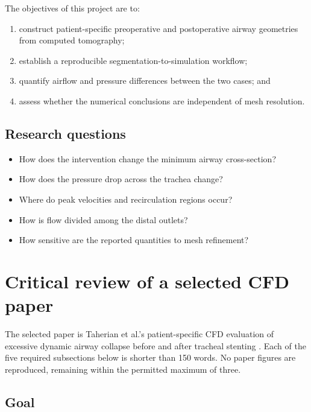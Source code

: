 \documentclass[11pt,a4paper]{article}
\begin{document}
The objectives of this project are to:

\begin{enumerate}[label=\arabic*.]
  \item construct patient-specific preoperative and postoperative airway
        geometries from computed tomography;
  \item establish a reproducible segmentation-to-simulation workflow;
  \item quantify airflow and pressure differences between the two cases; and
  \item assess whether the numerical conclusions are independent of mesh
        resolution.
\end{enumerate}

\subsection{Research questions}

\begin{itemize}
  \item How does the intervention change the minimum airway cross-section?
  \item How does the pressure drop across the trachea change?
  \item Where do peak velocities and recirculation regions occur?
  \item How is flow divided among the distal outlets?
  \item How sensitive are the reported quantities to mesh refinement?
\end{itemize}

\section{Critical review of a selected CFD paper}
\label{sec:paper_review}

The selected paper is Taherian et al.'s patient-specific CFD evaluation of
excessive dynamic airway collapse before and after tracheal stenting
\cite{taherian2017}. Each of the five required subsections below is shorter than
150 words. No paper figures are reproduced, remaining within the permitted
maximum of three.

\subsection{Goal}
\end{document}
